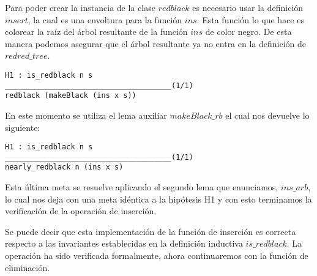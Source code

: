 Para poder crear la instancia de la clase \hyperref[class_rb]{$redblack$} es necesario usar la 
definici\'on \hyperref[raiz_negra_func]{$insert$}, la cual es una envoltura para la funci\'on 
\hyperref[func_ins]{$ins$}. Esta funci\'on lo que hace es colorear la ra\'iz del \'arbol 
resultante de la funci\'on \hyperref[func_ins]{$ins$} de color negro. De esta manera podemos 
asegurar que el \'arbol resultante ya no entra en la definici\'on de 
\hyperref[inductive_isRedB]{$redred\_tree$}.

\begin{verbatim}
H1 : is_redblack n s
______________________________________(1/1)
redblack (makeBlack (ins x s))
\end{verbatim}

En este momento se utiliza el lema auxiliar \hyperref[lema_3]{$makeBlack\_rb$} el cual nos devuelve 
lo siguiente:

\begin{verbatim}
H1 : is_redblack n s
______________________________________(1/1)
nearly_redblack n (ins x s)
\end{verbatim}

Esta \'ultima meta se resuelve aplicando el segundo lema que enunciamos, 
\hyperref[lema_2]{$ins\_arb$}, lo cual nos deja con una meta idéntica a la hipótesis H1 y con esto 
terminamos la verificaci\'on de la operaci\'on de inserci\'on.

Se puede decir que esta implementaci\'on de la funci\'on de inserci\'on es correcta respecto a las 
invariantes establecidas en la definici\'on inductiva \hyperref[inductive_isRedB]{$is\_redblack$}. 
La operaci\'on  ha sido verificada formalmente, ahora continuaremos con la funci\'on de 
eliminaci\'on.
